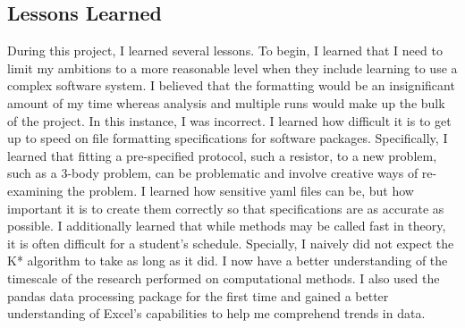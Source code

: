 \documentclass[12pt]{extarticle}
\begin{document}
\subsection{Lessons Learned}
During this project, I learned several lessons. To begin, I learned that I need to limit my ambitions to a more reasonable level when they include learning to use a complex software system. I believed that the formatting would be an insignificant amount of my time whereas analysis and multiple runs would make up the bulk of the project. In this instance, I was incorrect. I learned how difficult it is to get up to speed on file formatting specifications for software packages. Specifically, I learned that fitting a pre-specified protocol, such a resistor, to a new problem, such as a 3-body problem, can be problematic and involve creative ways of re-examining the problem. I learned how sensitive yaml files can be, but how important it is to create them correctly so that specifications are as accurate as possible.  I additionally learned that while methods may be called fast in theory, it is often difficult for a student's schedule. Specially, I naively did not expect the K* algorithm to take as long as it did. I now have a better understanding of the timescale of the research performed on computational methods. I also used the pandas data processing package for the first time and gained a better understanding of Excel's capabilities to help me comprehend trends in data. 
\end{document}
